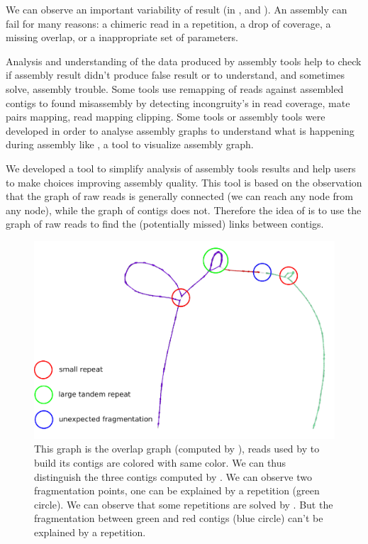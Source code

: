 \documentclass[main.tex]{subfiles}
\begin{document}
We can observe an important variability of result (in \canu, \wtdbg and ). An assembly can fail for many reasons: a chimeric read in a repetition, a drop of coverage, a missing overlap, or a inappropriate  set of parameters.

Analysis and understanding of the data produced by assembly tools help to check if assembly result didn't produce false result or to understand, and sometimes solve, assembly trouble. Some tools use remapping of reads against assembled contigs to found misassembly by detecting incongruity's in read coverage, mate pairs mapping, read mapping clipping.
Some tools or assembly tools were developed in order to analyse assembly graphs to understand what is happening during assembly like  \cite{bandage}, a tool to visualize assembly graph.

We developed \knot a tool to simplify analysis of assembly tools results and help users to make choices improving assembly quality.
This tool is based on the observation that the graph of raw reads is generally connected (we can reach any node from any node), while the graph of contigs does not. Therefore the idea of \knot is to use the graph of raw reads to find the (potentially missed) links between contigs.

\begin{figure}[ht]
    \includegraphics[width=\textwidth]{postassembly/images/t_roseus_projection_annoted.pdf}
    \caption{This graph is the overlap graph (computed by \minimap), reads used by \canu to build its contigs are colored with same color. We can thus distinguish the three contigs computed by \canu. We can observe two fragmentation points, one can be explained by a repetition (green circle). We can observe that some repetitions are solved by \canu. But the fragmentation between green and red contigs (blue circle) can't be explained by a repetition.}%
    \label{postassembly:fig:t_roseus_example}
\end{figure}
\end{document}
